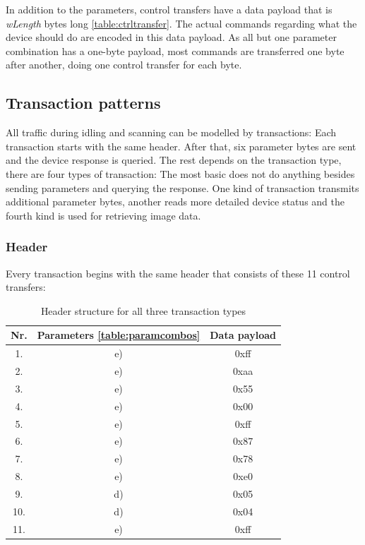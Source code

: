 \documentclass{article}
\begin{document}
In addition to the parameters, control transfers have a data payload that is {\it wLength} bytes long \autoref{table:ctrltransfer}.
The actual commands regarding what the device should do are encoded in this data payload.
As all but one parameter combination has a one-byte payload, most commands are transferred
one byte after another, doing one control transfer for each byte.

\subsection{Transaction patterns}

All traffic during idling and scanning can be modelled by transactions: Each transaction
starts with the same header. After that, six parameter bytes are sent and the
device response is queried. The rest depends on the transaction type, there
are four types of transaction: The most basic does not do anything besides sending parameters and querying the response.
One kind of transaction transmits additional parameter bytes, another reads more detailed device status
and the fourth kind is used for retrieving image data.

\subsubsection{Header}

Every transaction begins with the same header that consists of these 11 control transfers:

\begin{table}[H]
  \caption{Header structure for all three transaction types}
  \centering
  \begin{tabular}{c | c | c}
    Nr. & Parameters \autoref{table:paramcombos} & Data payload \\ \hline
    1. & e) & 0xff \\
    2. & e) & 0xaa \\
    3. & e) & 0x55 \\
    4. & e) & 0x00 \\
    5. & e) & 0xff \\
    6. & e) & 0x87 \\
    7. & e) & 0x78 \\
    8. & e) & 0xe0 \\
    9. & d) & 0x05 \\
    10. & d) & 0x04 \\
    11. & e) & 0xff \\
  \end{tabular}
  \label{table:transheader}
\end{table}
\end{document}
